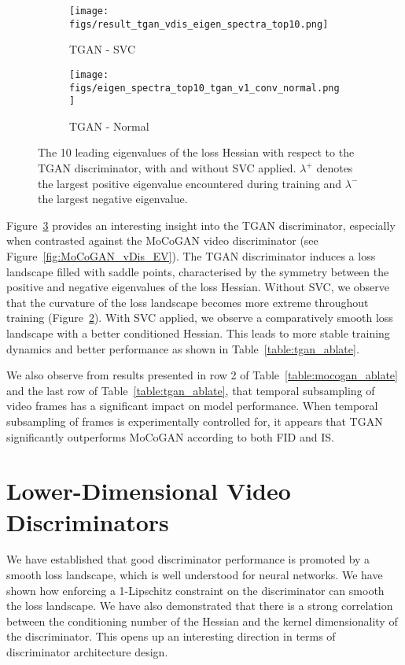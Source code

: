 \documentclass[a4paper,fleqn]{cas-sc}
\begin{document}
\begin{figure}[pos=!h]
    \centering
    \begin{subfigure}[t]{0.5\textwidth}
        \centering
        \texttt{[image: figs/result\_tgan\_vdis\_eigen\_spectra\_top10.png]}
        \caption{TGAN - SVC}
        \label{fig:TGAN_SVC_EV}
    \end{subfigure}\begin{subfigure}[t]{0.5\textwidth}
        \centering
        \texttt{[image: figs/eigen\_spectra\_top10\_tgan\_v1\_conv\_normal.png]}
        \caption{TGAN - Normal}
        \label{fig:TGAN_Normal_EV}
    \end{subfigure}
\caption{The 10 leading eigenvalues of the loss Hessian with respect to the TGAN discriminator, with and without SVC applied.  $\lambda^{+}$ denotes the largest positive eigenvalue encountered during training and $\lambda^{-}$ the largest negative eigenvalue.} 
    \label{fig:TGAN_EV}
\end{figure}

Figure~\ref{fig:TGAN_EV} provides an interesting insight into the TGAN discriminator, especially when contrasted against the MoCoGAN video discriminator (see Figure~\ref{fig:MoCoGAN_vDis_EV}). The TGAN discriminator induces a loss landscape filled with saddle points, characterised by the symmetry between the positive and negative eigenvalues of the loss Hessian. Without SVC, we observe that the curvature of the loss landscape becomes more extreme throughout training (Figure~\ref{fig:TGAN_Normal_EV}). With SVC applied, we observe a comparatively smooth loss landscape with a better conditioned Hessian. This leads to more stable training dynamics and better performance as shown in Table~\ref{table:tgan_ablate}. 

We also observe from results presented in row 2 of Table~\ref{table:mocogan_ablate} and the last row of Table~\ref{table:tgan_ablate}, that temporal subsampling of video frames has a significant impact on model performance. When temporal subsampling of frames is experimentally controlled for, it appears that TGAN significantly outperforms MoCoGAN according to both FID and IS.

\section{Lower-Dimensional Video Discriminators}
\label{sec:ldvd}
We have established that good discriminator performance is promoted by a smooth loss landscape, which is well understood for neural networks. We have shown how enforcing a 1-Lipschitz constraint on the discriminator can smooth the loss landscape. We have also demonstrated that there is a strong correlation between the conditioning number of the Hessian and the kernel dimensionality of the discriminator. This opens up an interesting direction in terms of discriminator architecture design. 
\end{document}
